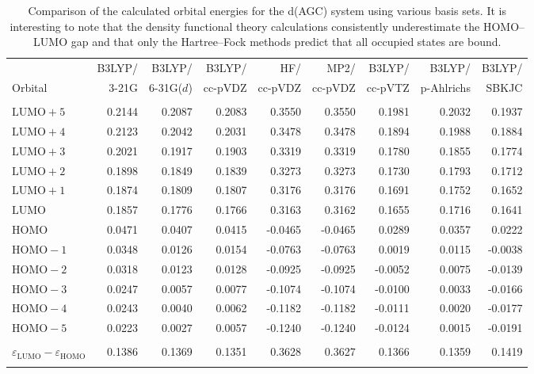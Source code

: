 \begin{sidewaystable}
  \begin{tabular}{lrrrrrrrr}
                    & B3LYP/ & B3LYP/     & B3LYP/  & HF/     & MP2/    & B3LYP/  & B3LYP/     & B3LYP/  \\
  Orbital           & 3-21G  & 6-31G($d$) & cc-pVDZ & cc-pVDZ & cc-pVDZ & cc-pVTZ & p-Ahlrichs & SBKJC   \\
  \hline\\[0.5ex]
  $\mathrm{LUMO}+5$ & 0.2144 & 0.2087     & 0.2083  &  0.3550 &  0.3550 &  0.1981 & 0.2032     &  0.1937 \\
  $\mathrm{LUMO}+4$ & 0.2123 & 0.2042     & 0.2031  &  0.3478 &  0.3478 &  0.1894 & 0.1988     &  0.1884 \\
  $\mathrm{LUMO}+3$ & 0.2021 & 0.1917     & 0.1903  &  0.3319 &  0.3319 &  0.1780 & 0.1855     &  0.1774 \\
  $\mathrm{LUMO}+2$ & 0.1898 & 0.1849     & 0.1839  &  0.3273 &  0.3273 &  0.1730 & 0.1793     &  0.1712 \\
  $\mathrm{LUMO}+1$ & 0.1874 & 0.1809     & 0.1807  &  0.3176 &  0.3176 &  0.1691 & 0.1752     &  0.1652 \\
  $\mathrm{LUMO}$   & 0.1857 & 0.1776     & 0.1766  &  0.3163 &  0.3162 &  0.1655 & 0.1716     &  0.1641 \\
  $\mathrm{HOMO}$   & 0.0471 & 0.0407     & 0.0415  & -0.0465 & -0.0465 &  0.0289 & 0.0357     &  0.0222 \\
  $\mathrm{HOMO}-1$ & 0.0348 & 0.0126     & 0.0154  & -0.0763 & -0.0763 &  0.0019 & 0.0115     & -0.0038 \\
  $\mathrm{HOMO}-2$ & 0.0318 & 0.0123     & 0.0128  & -0.0925 & -0.0925 & -0.0052 & 0.0075     & -0.0139 \\
  $\mathrm{HOMO}-3$ & 0.0247 & 0.0057     & 0.0077  & -0.1074 & -0.1074 & -0.0100 & 0.0033     & -0.0166 \\
  $\mathrm{HOMO}-4$ & 0.0243 & 0.0040     & 0.0062  & -0.1182 & -0.1182 & -0.0111 & 0.0020     & -0.0177 \\
  $\mathrm{HOMO}-5$ & 0.0223 & 0.0027     & 0.0057  & -0.1240 & -0.1240 & -0.0124 & 0.0015     & -0.0191 \\
  \hline\\[0.5ex]
  $\varepsilon_\mathrm{LUMO} - \varepsilon_\mathrm{HOMO}$ &
                      0.1386 & 0.1369     & 0.1351  & 0.3628  & 0.3627  &  0.1366 & 0.1359     &  0.1419 \\
  \hline\\[0.5ex]
  \end{tabular}
  \caption{Comparison of the calculated orbital energies for the
  d(AGC) system using various basis sets.  It is interesting to note
  that the density functional theory calculations consistently
  underestimate the HOMO--LUMO gap and that only the Hartree--Fock
  methods predict that all occupied states are bound.\label{Tab:Trimer_Orbital_Energies}}
\end{sidewaystable}


